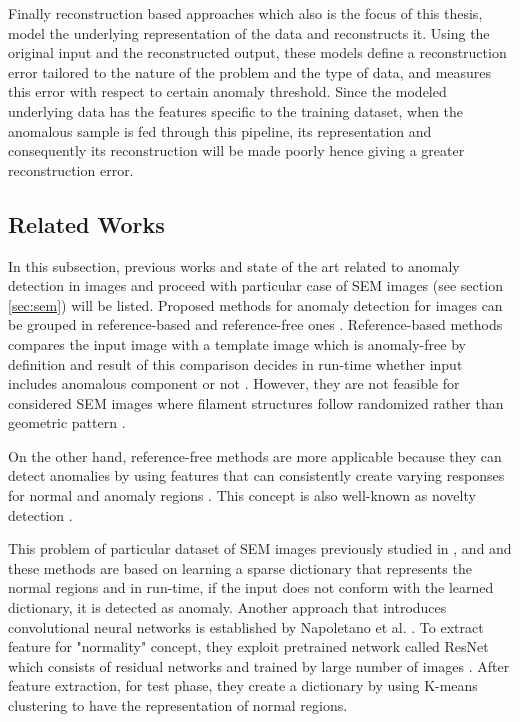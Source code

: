 Finally reconstruction based approaches which also is the focus of this thesis, model the underlying
representation of the data and reconstructs it. Using the original input and the reconstructed
output, these models define a reconstruction error tailored to the nature of the problem and the
type of data, and measures this error with respect to certain anomaly threshold. Since the modeled
underlying data has the features specific to the training dataset, when the anomalous sample is
fed through this pipeline, its representation and consequently its reconstruction will be made
poorly hence giving a greater reconstruction error. 

\subsection{Related Works}
\label{sec:relworks}

In this subsection, previous works and state of the art related to anomaly detection in images and proceed with
particular case of SEM images (see section \ref{sec:sem}) will be listed. Proposed methods for anomaly detection for images can be 
grouped in reference-based and reference-free ones \cite{Chandola:2009:ADS:1541880.1541882}. Reference-based methods 
compares the input image with a template image which is anomaly-free by definition and result of this 
comparison decides in run-time whether input includes anomalous component or not \cite{zontak2010defect}.
However, they are not feasible for considered SEM images where filament structures follow
randomized rather than geometric pattern \cite{carrera2016defect}. 

On the other hand, reference-free methods are more applicable because they can detect anomalies by 
using features that can consistently create varying responses for normal and anomaly regions
\cite{carrera2016defect}. This concept is also well-known as novelty detection \cite{Pimentel:2014:RRN:2588908.2589196}. 

This problem of particular dataset of SEM images previously studied in \cite{carrera2016defect},
\cite{carrera-2016-scale} and \cite{boracchi2014novelty} and these methods are based on learning a 
sparse dictionary that represents the normal regions and in run-time, if the input does not conform 
with the learned dictionary, it is detected as anomaly. Another approach that introduces convolutional 
neural networks is established by Napoletano et al. \cite{Napoletano2018anomaly}. To extract feature 
for "normality" concept, they exploit pretrained network called ResNet  which consists of residual networks 
and trained by large number of images \cite{he2016deep}. After feature extraction, for test phase, they 
create a dictionary by using K-means clustering to have the representation of normal regions.

